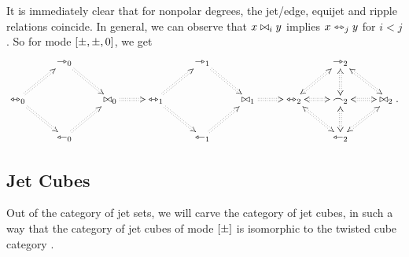 \documentclass[a4paper]{article}
\begin{document}
It is immediately clear that for nonpolar degrees, the jet/edge, equijet and ripple relations coincide.
In general, we can observe that $x \mathrel{\bowtie}_i y$ implies $x \leftrightarrowtriangle_j y$ for $i < j$.
So for mode $[{\pm}, {\pm}, 0]$, we get
\[
\xymatrix{
	& 
	\jet_0
		\ar@{:>}[rd]
	&&& 
	\jet_1 
		\ar@{:>}[rd]
	&&& 
	\jet_2 
		\ar@{<:>}[rd]
	\\
	\equijet_0
		\ar@{:>}[ru]
		\ar@{:>}[rd]
	&&
	\ripple_0
		\ar@{:>}[r]
	&
	\equijet_1
		\ar@{:>}[ru]
		\ar@{:>}[rd]
	&&
	\ripple_1
		\ar@{:>}[r]
	&
	\equijet_2
		\ar@{<:>}[ru]
		\ar@{<:>}[rd]
	&
	\bridge_2
		\ar@{<:>}[l]
		\ar@{<:>}[u]
		\ar@{<:>}[r]
		\ar@{<:>}[d]
	&
	\ripple_2.
	\\
	& 
	\tej_0 
		\ar@{:>}[ru]
	&&& 
	\tej_1 
		\ar@{:>}[ru]
	&&& 
	\tej_2 
		\ar@{<:>}[ru]
}
\]

\subsection{Jet Cubes}
Out of the category of jet sets, we will carve the category of jet cubes, in such a way that the category of jet cubes of mode $[{\pm}]$ is isomorphic to the twisted cube category \cite{pinyo-twisted}.




\end{document}
